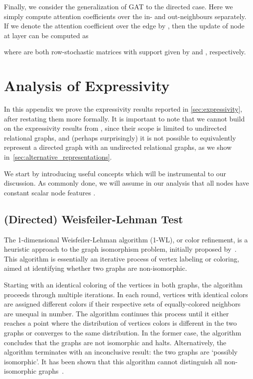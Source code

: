 \documentclass{article}
\theoremstyle{plain}
\theoremstyle{definition}
\theoremstyle{remark}
\begin{document}
\noindent Finally, we consider the generalization of GAT \cite{velivckovic2017graph} to the directed case. Here we simply compute attention coefficients over the in- and out-neighbours separately. If we denote the attention coefficient over the edge  by , then the update of node  at layer  can be computed as 

\noindent where  are both row-stochastic matrices with support given by  and , respectively.



\section{Analysis of Expressivity} \label{app:expressivity_analysis}

In this appendix we prove the expressivity results reported in \cref{sec:expressivity}, after restating them more formally. It is important to note that we cannot build on the expressivity results from \citet{barcelo2022weisfeiler}, since their scope is limited to undirected relational graphs, and (perhaps surprisingly) it is not possible to equivalently represent a directed graph with an undirected relational graphs, as we show in~\cref{sec:alternative_representations}. 


We start by introducing useful concepts which will be instrumental to our discussion. As commonly done, we will assume in our analysis that all nodes have constant scalar node features . 

\subsection{(Directed) Weisfeiler-Lehman Test} \label{sec:appendix_wl}
The 1-dimensional Weisfeiler-Lehman algorithm (1-WL), or color refinement, is a heuristic approach to the graph isomorphism problem, initially proposed by~\citet{weisfeiler1968reduction}. This algorithm is essentially an iterative process of vertex labeling or coloring, aimed at identifying whether two graphs are non-isomorphic.

Starting with an identical coloring of the vertices in both graphs, the algorithm proceeds through multiple iterations. In each round, vertices with identical colors are assigned different colors if their respective sets of equally-colored neighbors are unequal in number. The algorithm continues this process until it either reaches a point where the distribution of vertices colors is different in the two graphs or converges to the same distribution. In the former case, the algorithm concludes that the graphs are not isomorphic and halts. Alternatively, the algorithm terminates with an inconclusive result: the two graphs are `possibly isomorphic'. It has been shown that this algorithm cannot distinguish all non-isomorphic graphs~\cite{cai1992anoptimal}. 
\end{document}
